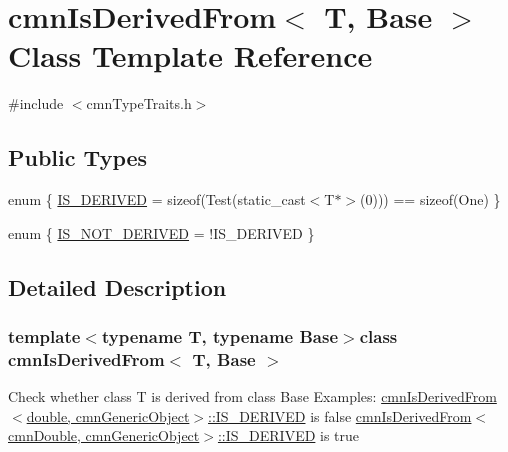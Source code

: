 \hypertarget{classcmn_is_derived_from}{\section{cmn\-Is\-Derived\-From$<$ T, Base $>$ Class Template Reference}
\label{classcmn_is_derived_from}
}


{\ttfamily \#include $<$cmn\-Type\-Traits.\-h$>$}

\subsection*{Public Types}
\begin{DoxyCompactItemize}
\item 
enum \{ \hyperlink{classcmn_is_derived_from_a65a36468e89d50a80c11e25cf58c8e75af3a2348d584176f8c4bfae532328995c}{I\-S\-\_\-\-D\-E\-R\-I\-V\-E\-D} = sizeof(Test(static\-\_\-cast$<$T$\ast$$>$(0))) == sizeof(One)
 \}
\item 
enum \{ \hyperlink{classcmn_is_derived_from_a8c4e19bd9b70a51bfc0d6bd0aea19334a533e6436963bc9d801b91be0244d5050}{I\-S\-\_\-\-N\-O\-T\-\_\-\-D\-E\-R\-I\-V\-E\-D} = !\-I\-S\-\_\-\-D\-E\-R\-I\-V\-E\-D
 \}
\end{DoxyCompactItemize}


\subsection{Detailed Description}
\subsubsection*{template$<$typename T, typename Base$>$class cmn\-Is\-Derived\-From$<$ T, Base $>$}

Check whether class T is derived from class Base Examples\-: \hyperlink{classcmn_is_derived_from_a65a36468e89d50a80c11e25cf58c8e75af3a2348d584176f8c4bfae532328995c}{cmn\-Is\-Derived\-From$<$double, cmn\-Generic\-Object$>$\-::\-I\-S\-\_\-\-D\-E\-R\-I\-V\-E\-D} is false \hyperlink{classcmn_is_derived_from_a65a36468e89d50a80c11e25cf58c8e75af3a2348d584176f8c4bfae532328995c}{cmn\-Is\-Derived\-From$<$cmn\-Double, cmn\-Generic\-Object$>$\-::\-I\-S\-\_\-\-D\-E\-R\-I\-V\-E\-D} is true 

